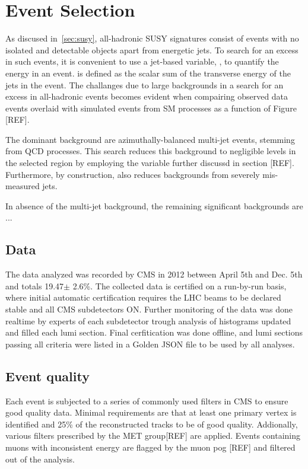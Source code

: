 \clearpage
\section{Event Selection\label{sec:eventSelection}}

As discused in~\ref{sec:susy}, all-hadronic SUSY signatures consist of events with
no isolated and detectable objects apart from energetic jets. To search
for an excess in such events, it is convenient to use a jet-based variable,
\scalht, to quantify the energy in an event.  \scalht is defined as the scalar
sum of the transverse energy of the jets in the event. The challanges due to large
backgrounds in a search for an excess in all-hadronic events becomes evident 
when compairing observed data events overlaid with simulated events from 
SM processes as a function of \scalht Figure [REF].
 
The dominant background are azimuthally-balanced multi-jet events, stemming from QCD
processes. This search reduces this background to negligible levels in the
selected region by employing the \alphat variable further discussd in section [REF].
Furthermore, by construction, \alphat also reduces backgrounds from severely mis-measured
jets. 

In absence of the multi-jet background, the remaining significant backgrounds are ...

\subsection{Data}
The data analyzed was recorded by CMS in 2012 between April 5th and Dec. 5th and
totals 19.47$\pm$ 2.6\%. The collected data is certified on a run-by-run 
basis, where initial automatic certification requires the LHC beams to be declared
stable and all CMS subdetectors ON. Further monitoring of the data was done realtime
by experts of each subdetector trough analysis of histograms updated and filled
each lumi section. Final cerfitication was done offline, and lumi sections passing
all criteria were listed in a Golden JSON file to be used by all analyses. 

\subsection{Event quality}

Each event is subjected to a series of commonly used filters in CMS to ensure good
quality data. Minimal requirements are that at least one primary vertex is identified 
and 25\% of the reconstructed tracks to be of good quality. Addionally, various filters 
prescribed by the MET group[REF] are applied. Events containing muons with inconsistent
energy are flagged by the muon pog [REF] and filtered out of the analysis. 

